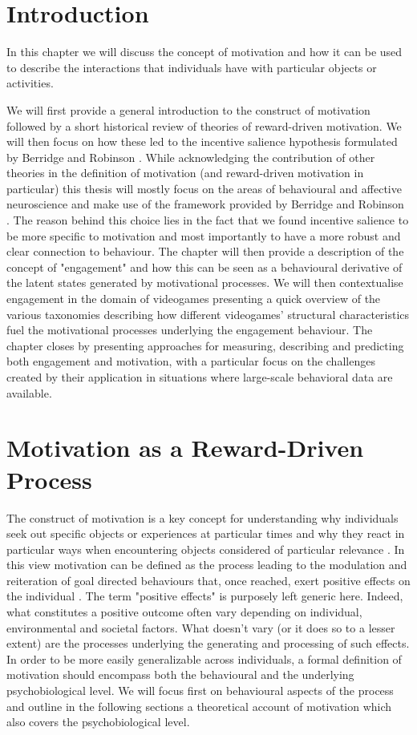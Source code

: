 \section{Introduction}
\label{motivation_engagement_introduction}
In this chapter we will discuss the concept of motivation and how it can be used to describe the interactions that individuals have with particular objects or activities. 

We will first provide a general introduction to the construct of motivation followed by a short historical review of theories of reward-driven motivation. We will then focus on how these led to the incentive salience hypothesis formulated by Berridge and Robinson \cite{berridge1998role}. While acknowledging the contribution of other theories in the definition of motivation (and reward-driven motivation in particular) this thesis will mostly focus on the areas of behavioural and affective neuroscience and make use of the framework provided by Berridge and Robinson \cite{berridge1998role}. The reason behind this choice lies in the fact that we found incentive salience to be more specific to motivation and most importantly to have a more robust and clear connection to behaviour. The chapter will then provide a description of the concept of "engagement" and how this can be seen as a behavioural derivative of the latent states generated by motivational processes. We will then contextualise engagement in the domain of videogames presenting a quick overview of the various taxonomies describing how different videogames' structural characteristics fuel the motivational processes underlying the engagement behaviour. The chapter closes by presenting approaches for measuring, describing and predicting both engagement and motivation, with a particular focus on the challenges created by their application in situations where large-scale behavioral data are available.

\section{Motivation as a Reward-Driven Process}
\label{motivation}
The construct of motivation is a key concept for understanding why individuals seek out specific objects or experiences at particular times and why they react in particular ways when encountering objects considered of particular relevance \cite{berridge2004motivation}. In this view motivation can be defined as the process leading to the modulation and reiteration of goal directed behaviours that, once reached, exert positive effects on the individual \cite{simpson2016behavioral}. The term "positive effects" is purposely left generic here. Indeed, what constitutes a positive outcome often vary depending on individual, environmental and societal factors. What doesn't vary (or it does so to a lesser extent) are the processes underlying the generating and processing of such effects. In order to be more easily generalizable across individuals, a formal definition of motivation should encompass both the behavioural and the underlying psychobiological level. We will focus first on behavioural aspects of the process and outline in the following sections a theoretical account of motivation which also covers the psychobiological level. 

